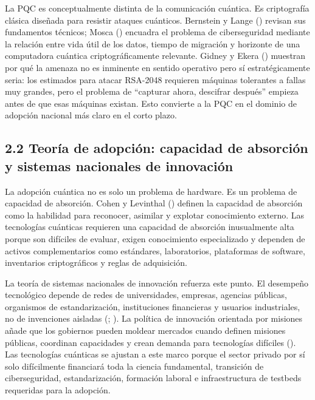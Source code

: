 \documentclass[
  11pt,
  letterpaper,
]{article}
\begin{document}
La PQC es conceptualmente distinta de la comunicación cuántica. Es
criptografía clásica diseñada para resistir ataques cuánticos. Bernstein
y Lange () revisan sus fundamentos
técnicos; Mosca () encuadra el problema de
ciberseguridad mediante la relación entre vida útil de los datos, tiempo
de migración y horizonte de una computadora cuántica criptográficamente
relevante. Gidney y Ekera () muestran por
qué la amenaza no es inminente en sentido operativo pero sí
estratégicamente seria: los estimados para atacar RSA-2048 requieren
máquinas tolerantes a fallas muy grandes, pero el problema de ``capturar
ahora, descifrar después'' empieza antes de que esas máquinas existan.
Esto convierte a la PQC en el dominio de adopción nacional más claro en
el corto plazo.

\subsection{2.2 Teoría de adopción: capacidad de absorción y sistemas
nacionales de
innovación}\label{teoruxeda-de-adopciuxf3n-capacidad-de-absorciuxf3n-y-sistemas-nacionales-de-innovaciuxf3n}

La adopción cuántica no es solo un problema de hardware. Es un problema
de capacidad de absorción. Cohen y Levinthal
() definen la capacidad de absorción como
la habilidad para reconocer, asimilar y explotar conocimiento externo.
Las tecnologías cuánticas requieren una capacidad de absorción
inusualmente alta porque son difíciles de evaluar, exigen conocimiento
especializado y dependen de activos complementarios como estándares,
laboratorios, plataformas de software, inventarios criptográficos y
reglas de adquisición.

La teoría de sistemas nacionales de innovación refuerza este punto. El
desempeño tecnológico depende de redes de universidades, empresas,
agencias públicas, organismos de estandarización, instituciones
financieras y usuarios industriales, no de invenciones aisladas
(;
). La política de innovación
orientada por misiones añade que los gobiernos pueden moldear mercados
cuando definen misiones públicas, coordinan capacidades y crean demanda
para tecnologías difíciles (). Las tecnologías cuánticas se ajustan a este marco porque el
sector privado por sí solo difícilmente financiará toda la ciencia
fundamental, transición de ciberseguridad, estandarización, formación
laboral e infraestructura de testbeds requeridas para la adopción.
\end{document}
